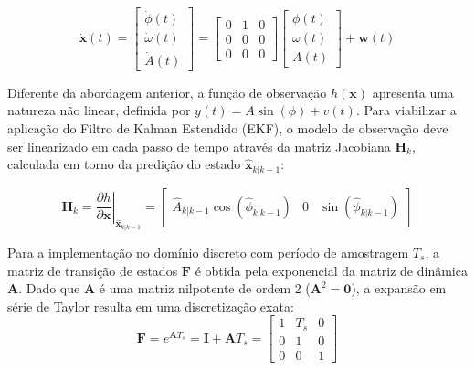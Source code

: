 \documentclass[a4paper,12pt]{article}
\begin{document}
\begin{equation}
    \dot{\mathbf{x}}(t) = \begin{bmatrix} \dot{\phi}(t)  \\ \dot{\omega}(t) \\ \dot{A}(t) \end{bmatrix}  = \begin{bmatrix}  0 & 1 & 0  \\ 0  & 0 & 0\\ 0 & 0 & 0\end{bmatrix} \begin{bmatrix} \phi(t)  \\ \omega(t)  \\ A(t)  \end{bmatrix} + \mathbf{w}(t)
    \label{eq:mod2_cont_dinamica}
\end{equation}

Diferente da abordagem anterior, a função de observação $h(\mathbf{x})$ apresenta uma natureza não linear, definida por $y(t) = A\sin(\phi) + v(t)$. Para viabilizar a aplicação do Filtro de Kalman Estendido (EKF), o modelo de observação deve ser linearizado em cada passo de tempo através da matriz Jacobiana $\mathbf{H}_k$, calculada em torno da predição do estado $\hat{\mathbf{x}}_{k|k-1}$:

\begin{equation}
    \mathbf{H}_k = \left. \frac{\partial h}{\partial \mathbf{x}} \right|_{\hat{\mathbf{x}}_{k|k-1}} = \begin{bmatrix} \hat{A}_{k|k-1} \cos(\hat{\phi}_{k|k-1}) & 0 & \sin(\hat{\phi}_{k|k-1}) \end{bmatrix}
    \label{eq:mod2_H_jacobiana}
\end{equation}

Para a implementação no domínio discreto com período de amostragem $T_s$, a matriz de transição de estados $\mathbf{F}$ é obtida pela exponencial da matriz de dinâmica $\mathbf{A}$. Dado que $\mathbf{A}$ é uma matriz nilpotente de ordem 2 ($\mathbf{A}^2 = \mathbf{0}$), a expansão em série de Taylor resulta em uma discretização exata:
\begin{equation}
    \mathbf{F} = e^{\mathbf{A}T_s} = \mathbf{I} + \mathbf{A}T_s = \begin{bmatrix} 1 & T_s & 0 \\ 0 & 1 & 0 \\ 0 & 0 & 1 \end{bmatrix}
    \label{eq:mod2_F_discreta}
\end{equation}
\end{document}
